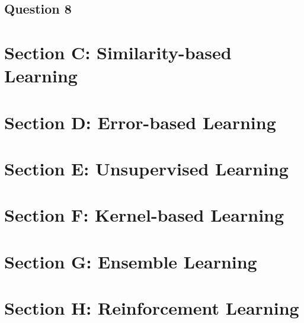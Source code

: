 \documentclass[10pt]{article}
\begin{document}
\subsection*{Question 8}

\section*{Section C: Similarity-based Learning}

\section*{Section D: Error-based Learning}

\section*{Section E: Unsupervised Learning}

\section*{Section F: Kernel-based Learning}

\section*{Section G: Ensemble Learning}

\section*{Section H: Reinforcement Learning}

 

\end{document}
